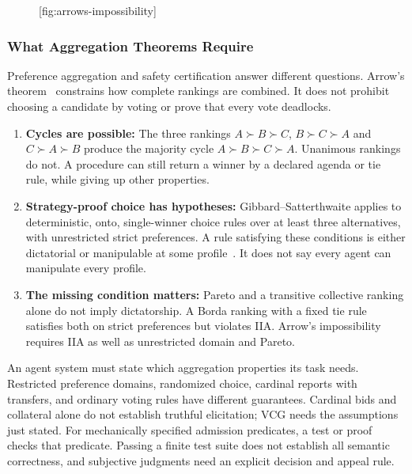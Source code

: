 \documentclass[11pt,a4paper]{article}
\begin{document}
\begin{figure}[tp]
  \centering
  [fig:arrows-impossibility]
\end{figure}

\subsubsection{What Aggregation Theorems Require}
\label{sec:why-arrows-matters}

Preference aggregation and safety certification answer different questions. Arrow's theorem~ constrains how complete rankings are combined. It does not prohibit choosing a candidate by voting or prove that every vote deadlocks.
\begin{enumerate}[leftmargin=1.8em,itemsep=2pt]
  \item \textbf{Cycles are possible:} The three rankings $A\succ B\succ C$, $B\succ C\succ A$ and $C\succ A\succ B$ produce the majority cycle $A\succ B\succ C\succ A$. Unanimous rankings do not. A procedure can still return a winner by a declared agenda or tie rule, while giving up other properties.
  \item \textbf{Strategy-proof choice has hypotheses:} Gibbard--Satterthwaite applies to deterministic, onto, single-winner choice rules over at least three alternatives, with unrestricted strict preferences. A rule satisfying these conditions is either dictatorial or manipulable at some profile~. It does not say every agent can manipulate every profile.
  \item \textbf{The missing condition matters:} Pareto and a transitive collective ranking alone do not imply dictatorship. A Borda ranking with a fixed tie rule satisfies both on strict preferences but violates IIA. Arrow's impossibility requires IIA as well as unrestricted domain and Pareto.
\end{enumerate}

An agent system must state which aggregation properties its task needs. Restricted preference domains, randomized choice, cardinal reports with transfers, and ordinary voting rules have different guarantees. Cardinal bids and collateral alone do not establish truthful elicitation; VCG needs the assumptions just stated. For mechanically specified admission predicates, a test or proof checks that predicate. Passing a finite test suite does not establish all semantic correctness, and subjective judgments need an explicit decision and appeal rule.
\end{document}
